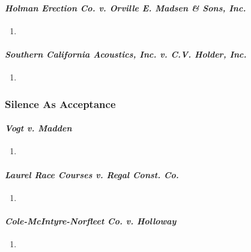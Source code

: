 \paragraph{\emph{Holman Erection Co. v. Orville E. Madsen \& Sons, Inc.}}

\begin{enumerate}
    \item %
\end{enumerate}

\paragraph{\emph{Southern California Acoustics, Inc. v. C.V. Holder, Inc.}}

\begin{enumerate}
    \item %
\end{enumerate}

\subsubsection{Silence As Acceptance}

\paragraph{\emph{Vogt v. Madden}}

\begin{enumerate}
    \item %
\end{enumerate}

\paragraph{\emph{Laurel Race Courses v. Regal Const. Co.}}

\begin{enumerate}
    \item %
\end{enumerate}

\paragraph{\emph{Cole-McIntyre-Norfleet Co. v. Holloway}}

\begin{enumerate}
    \item %
\end{enumerate}

